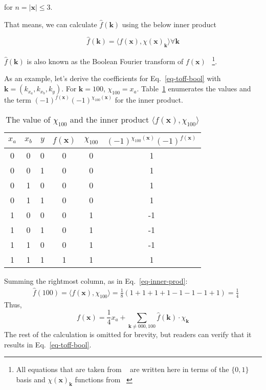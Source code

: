 for $n = |\mathbf{x}| \leq 3$.

That means, we can calculate $\hat{f}(\mathbf{k})$ using the below inner product

\begin{equation}
  \label{eq-fhat-prod}
  \hat{f}(\mathbf{k}) = \langle f(\mathbf{x}), \chi(\mathbf{x})_{\mathbf{k}} \rangle \forall \mathbf{k} 
\end{equation}

$\hat{f}(\mathbf{k})$ is also known as the Boolean Fourier transform of $f(\mathbf{x})$~\cite{bib-odonnell}
\footnote{All equations that are taken from ~\cite{bib-odonnell} are written here
in terms of the $\{0,1\}$ basis and $\chi(\mathbf{x})_{\mathbf{k}}$ functions from ~\cite{bib-amy-matroid}}.

\begin{example}
As an example, let's derive the coefficients for Eq.~\ref{eq-toff-bool} with $\mathbf{k} = (k_{x_a}, k_{x_b}, k_y)$.
For $\mathbf{k} = 100$, $\chi_{100} = x_a$. Table~\ref{table-ex-100} enumerates the values and the term $(-1)^{f(\mathbf{x})} (-1)^{\chi_{100}(\mathbf{x})}$ for the inner product.
\begin{table}[h]
  \begin{center}
    \begin{tabular}{c|c|c|c|c|c}
      \hline
      $x_a$ & $x_b$ & $y$ & $f(\mathbf{x})$ & $\chi_{100}$ & $(-1)^{\chi_{100}(\mathbf{x})} (-1)^{f(\mathbf{x})}$ \\\hline
      0 & 0 & 0 & 0 & 0 & 1\\\hline
      0 & 0 & 1 & 0 & 0 & 1\\\hline
      0 & 1 & 0 & 0 & 0 & 1\\\hline
      0 & 1 & 1 & 0 & 0 & 1\\\hline
      1 & 0 & 0 & 0 & 1 & -1\\\hline
      1 & 0 & 1 & 0 & 1 & -1\\\hline
      1 & 1 & 0 & 0 & 1 & -1\\\hline      
      1 & 1 & 1 & 1 & 1 & 1\\\hline
    \end{tabular}
    \caption{The value of $\chi_{100}$ and the inner product $\langle f(\mathbf{x}), \chi_{100} \rangle$}
    \label{table-ex-100}
  \end{center}
\end{table}

Summing the rightmost column, as in Eq.~\ref{eq-inner-prod}:
\begin{align}
    &\hat{f}(100) = \langle f(\mathbf{x}), \chi_{100} \rangle = \frac{1}{8} ( 1 + 1 + 1 + 1 - 1 - 1 - 1 + 1 ) = \frac{1}{4}
\end{align}
Thus,
\begin{equation}
  f(\mathbf{x}) = \frac{1}{4}x_a + \sum_{\mathbf{k} \neq 000,100} \hat{f}(\mathbf{k}) \cdot \chi_{\mathbf{k}}
\end{equation}
The rest of the calculation is omitted for brevity, but readers can verify that it results in Eq.~\ref{eq-toff-bool}.
\end{example}

